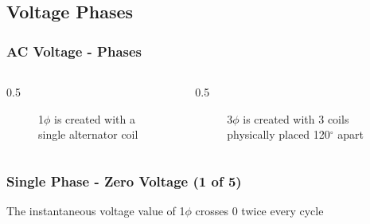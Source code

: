 \subsection{Voltage Phases}

\begin{frame}
    \frametitle{AC Voltage - Phases}

    \begin{columns}
        \begin{column}{0.5\linewidth}
            \begin{figure}
                \centering
                \resizebox{\columnwidth}{!}{
                    
                }

                \vspace{0.5em}
                {\footnotesize 1$\phi$ is created with a single alternator coil\par}
            \end{figure}
        \end{column}
        \begin{column}{0.5\linewidth}
            \begin{figure}
                \centering
                \resizebox{\columnwidth}{!}{
                    
                }

                \vspace{0.5em}
                {\footnotesize 3$\phi$ is created with 3 coils physically placed 120$^\circ$ apart\par}
            \end{figure}
        \end{column}
    \end{columns}
\end{frame}

\begin{frame}
    \frametitle{Single Phase - Zero Voltage (1 of 5)}

        \begin{figure}
            \centering
            \resizebox{0.75\linewidth}{!}{
                
            }
        \end{figure}

        \centering
        \vspace{0.5em}
        {\footnotesize The instantaneous voltage value of 1$\phi$ crosses 0 twice every cycle\par}
\end{frame}

